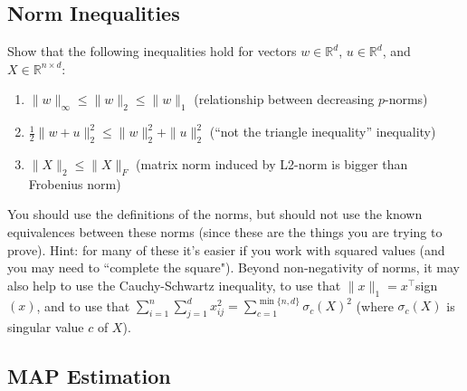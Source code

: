 \documentclass{article}
\def\blu#1{{\color{blu}#1}}
\def\norm#1{\|#1\|}
\def\R{\mathbb{R}}
\def\enum#1{\begin{enumerate}#1\end{enumerate}}
\begin{document}
\subsection{Norm Inequalities}

Show that the following inequalities hold for vectors $w \in \R^d$, $u \in \R^d$, and $X \in \R^{n\times d}$:
\blu{\enum{
\item $\norm{w}_\infty \leq \norm{w}_2 \leq \norm{w}_1$ (relationship between decreasing $p$-norms)
\item $\frac{1}{2}\norm{w+u}_2^2 \leq  \norm{w}_2^2 + \norm{u}_2^2$ (``not the triangle inequality'' inequality)
\item $\norm{X}_2 \leq \norm{X}_F$ (matrix  norm induced by L2-norm is bigger than Frobenius norm)
}
}
You should use the definitions of the norms, but should not use the %
known equivalences between these norms (since these are the things you are trying to prove).
Hint: for many of these it's easier if you work with squared values (and you may need to ``complete the square"). Beyond non-negativity of norms, it may also help to use the Cauchy-Schwartz inequality, to use that $\norm{x}_1 = x^\top $sign$(x)$, and to use that $\sum_{i=1}^n\sum_{j=1}^d x_{ij}^2 = \sum_{c = 1}^{\min\{n,d\}}\sigma_c(X)^2$ (where $\sigma_c(X)$ is singular value $c$ of $X$).



\subsection{MAP Estimation}
\end{document}
